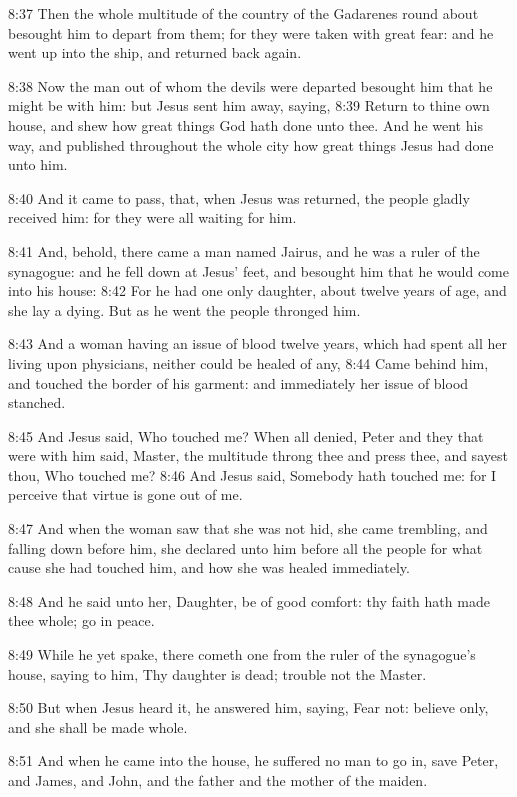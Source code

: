 8:37 Then the whole multitude of the country of the Gadarenes round
about besought him to depart from them; for they were taken with great
fear: and he went up into the ship, and returned back again.

8:38 Now the man out of whom the devils were departed besought him
that he might be with him: but Jesus sent him away, saying, 8:39
Return to thine own house, and shew how great things God hath done
unto thee. And he went his way, and published throughout the whole
city how great things Jesus had done unto him.

8:40 And it came to pass, that, when Jesus was returned, the people
gladly received him: for they were all waiting for him.

8:41 And, behold, there came a man named Jairus, and he was a ruler of
the synagogue: and he fell down at Jesus' feet, and besought him that
he would come into his house: 8:42 For he had one only daughter, about
twelve years of age, and she lay a dying. But as he went the people
thronged him.

8:43 And a woman having an issue of blood twelve years, which had
spent all her living upon physicians, neither could be healed of any,
8:44 Came behind him, and touched the border of his garment: and
immediately her issue of blood stanched.

8:45 And Jesus said, Who touched me? When all denied, Peter and they
that were with him said, Master, the multitude throng thee and press
thee, and sayest thou, Who touched me?  8:46 And Jesus said, Somebody
hath touched me: for I perceive that virtue is gone out of me.

8:47 And when the woman saw that she was not hid, she came trembling,
and falling down before him, she declared unto him before all the
people for what cause she had touched him, and how she was healed
immediately.

8:48 And he said unto her, Daughter, be of good comfort: thy faith
hath made thee whole; go in peace.

8:49 While he yet spake, there cometh one from the ruler of the
synagogue's house, saying to him, Thy daughter is dead; trouble not
the Master.

8:50 But when Jesus heard it, he answered him, saying, Fear not:
believe only, and she shall be made whole.

8:51 And when he came into the house, he suffered no man to go in,
save Peter, and James, and John, and the father and the mother of the
maiden.

